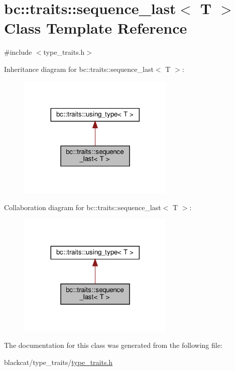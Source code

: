 \hypertarget{classbc_1_1traits_1_1sequence__last_3_01T_01_4}{}\section{bc\+:\+:traits\+:\+:sequence\+\_\+last$<$ T $>$ Class Template Reference}
\label{classbc_1_1traits_1_1sequence__last_3_01T_01_4}


{\ttfamily \#include $<$type\+\_\+traits.\+h$>$}



Inheritance diagram for bc\+:\+:traits\+:\+:sequence\+\_\+last$<$ T $>$\+:\nopagebreak
\begin{figure}[H]
\begin{center}
\leavevmode
\includegraphics[width=212pt]{classbc_1_1traits_1_1sequence__last_3_01T_01_4__inherit__graph}
\end{center}
\end{figure}


Collaboration diagram for bc\+:\+:traits\+:\+:sequence\+\_\+last$<$ T $>$\+:\nopagebreak
\begin{figure}[H]
\begin{center}
\leavevmode
\includegraphics[width=212pt]{classbc_1_1traits_1_1sequence__last_3_01T_01_4__coll__graph}
\end{center}
\end{figure}


The documentation for this class was generated from the following file\+:\begin{DoxyCompactItemize}
\item 
blackcat/type\+\_\+traits/\hyperlink{type__traits_2type__traits_8h}{type\+\_\+traits.\+h}\end{DoxyCompactItemize}

